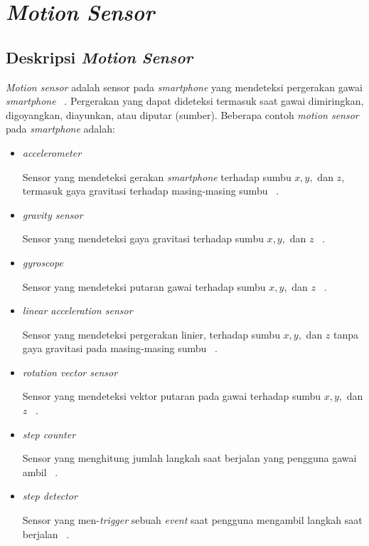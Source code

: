 \section{\textit{Motion Sensor}}
\label{subs:motion-sensor}

\subsection{Deskripsi \textit{Motion Sensor}}
\textit{Motion sensor} adalah sensor pada \textit{smartphone} yang mendeteksi pergerakan gawai \textit{smartphone} ~\cite{motion-sensor}. Pergerakan yang dapat dideteksi termasuk saat gawai dimiringkan, digoyangkan, diayunkan, atau diputar (sumber). Beberapa contoh \textit{motion sensor} pada \textit{smartphone} adalah:
\begin{itemize}
	\item \textit{accelerometer}
	
	Sensor yang mendeteksi gerakan \textit{smartphone} terhadap sumbu $x, y,$ dan $z$, termasuk gaya gravitasi terhadap masing-masing sumbu ~\cite{motion-sensor}.
	\item \textit{gravity sensor}
	
	Sensor yang mendeteksi gaya gravitasi terhadap sumbu $x, y,$ dan $z$ ~\cite{motion-sensor}.
	\item \textit{gyroscope}
	
	Sensor yang mendeteksi putaran gawai terhadap sumbu $x, y,$ dan $z$ ~\cite{motion-sensor}.
	\item \textit{linear acceleration sensor}
	
	Sensor yang mendeteksi pergerakan linier, terhadap sumbu $x, y,$ dan $z$ tanpa gaya gravitasi pada masing-masing sumbu ~\cite{motion-sensor}.
	\item \textit{rotation vector sensor}
	
	Sensor yang mendeteksi vektor putaran pada gawai terhadap sumbu $x, y,$ dan $z$ ~\cite{motion-sensor}.
	
	\item \textit{step counter}
	
	Sensor yang menghitung jumlah langkah saat berjalan yang pengguna gawai ambil ~\cite{motion-sensor}.
	\item \textit{step detector}
	
	Sensor yang men-\textit{trigger} sebuah \textit{event} saat pengguna mengambil langkah saat berjalan ~\cite{motion-sensor}.
\end{itemize}

